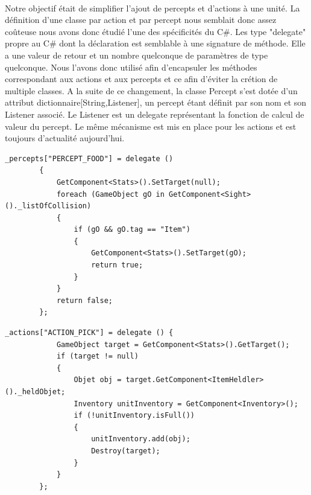 \documentclass{report}
\begin{document}
\paragraph{}
Notre objectif était de simplifier l'ajout de percepts et d'actions à une unité. La définition d'une classe par action et par percept nous semblait donc assez coûteuse nous avons donc étudié l'une des spécificités du C\#. Les type "delegate" propre au C\# dont la déclaration est semblable à  une signature de méthode. Elle a une valeur de retour et un nombre quelconque de paramètres de type quelconque.
Nous l'avons donc utilisé afin d'encapsuler les méthodes correspondant aux actions et aux percepts et ce afin d'éviter la crétion de multiple classes.
A la suite de ce changement, la classe Percept s'est dotée d'un attribut dictionnaire[String,Listener], un percept étant définit par son nom et son Listener associé. Le Listener est un delegate représentant la fonction de calcul de valeur du percept. Le même mécanisme est mis en place pour les actions et est toujours d'actualité aujourd'hui.
\begin{lstlisting}[language={[Sharp]C},label={lst:unitScript}, caption=  Extrait du code du script PerceptUnit.cs]
 _percepts["PERCEPT_FOOD"] = delegate ()
        {
            GetComponent<Stats>().SetTarget(null);
            foreach (GameObject gO in GetComponent<Sight>()._listOfCollision)
            {
                if (gO && gO.tag == "Item")
                {
                    GetComponent<Stats>().SetTarget(gO);
                    return true;
                }
            }
            return false;
        };
\end{lstlisting}
\begin{lstlisting}[language={[Sharp]C},label={lst:unitScript}, caption=  Extrait du code du script ActionUnit.cs]
_actions["ACTION_PICK"] = delegate () {
            GameObject target = GetComponent<Stats>().GetTarget();
            if (target != null)
            {
                Objet obj = target.GetComponent<ItemHeldler>()._heldObjet;
                Inventory unitInventory = GetComponent<Inventory>();
                if (!unitInventory.isFull())
                {
                    unitInventory.add(obj);
                    Destroy(target);
                }
            }
        };
\end{lstlisting}
\end{document}
